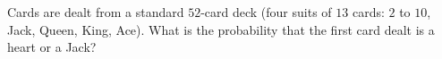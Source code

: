 Cards are dealt from a standard $52$-card deck (four suits of $13$ cards: $2$ to $10$, Jack, Queen, King, Ace). What is the probability that the first card dealt is a heart or a Jack?
